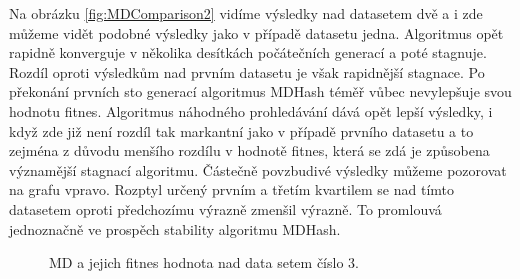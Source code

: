 Na obrázku \ref{fig:MDComparison2} vidíme výsledky nad datasetem dvě a i zde můžeme vidět podobné výsledky jako v případě datasetu
jedna. Algoritmus opět rapidně konverguje v několika desítkách počátečních generací a poté stagnuje. Rozdíl oproti výsledkům nad prvním
datasetu je však rapidnější stagnace. Po překonání prvních sto generací algoritmus MDHash téměř vůbec nevylepšuje svou hodnotu fitnes.
Algoritmus náhodného prohledávání dává opět lepší výsledky, i když zde již není rozdíl tak markantní jako v případě prvního datasetu a to 
zejména z důvodu menšího rozdílu v hodnotě fitnes, která se zdá je způsobena významější stagnací algoritmu. Částečně povzbudivé výsledky
můžeme pozorovat na grafu vpravo. Rozptyl určený prvním a třetím kvartilem se nad tímto datasetem oproti předchozímu výrazně zmenšil
výrazně. To promlouvá jednoznačně ve prospěch stability algoritmu MDHash.

\begin{figure}[!ht]
	\centering
	\caption{MD a jejich fitnes hodnota nad data setem číslo 3.}
	\label{fig:MDComparison3}
\end{figure}

